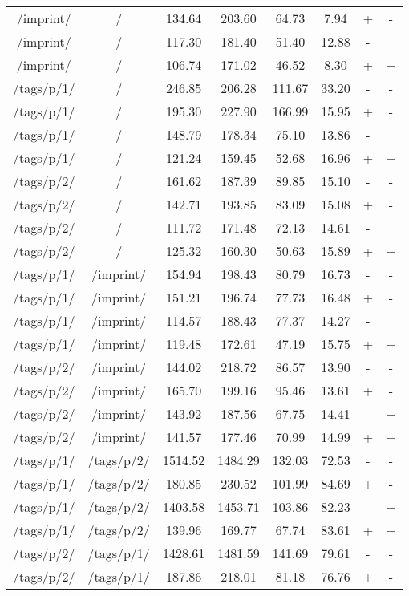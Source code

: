\begin{appendix}
\begin{center}
\begin{longtable}{cccccccc}
/imprint/ & / & 134.64 & 203.60 & 64.73 & 7.94 & + & - \\
/imprint/ & / & 117.30 & 181.40 & 51.40 & 12.88 & - & + \\
/imprint/ & / & 106.74 & 171.02 & 46.52 & 8.30 & + & + \\
\hline
\hline
/tags/p/1/ & / & 246.85 & 206.28 & 111.67 & 33.20 & - & - \\
/tags/p/1/ & / & 195.30 & 227.90 & 166.99 & 15.95 & + & - \\
/tags/p/1/ & / & 148.79 & 178.34 & 75.10 & 13.86 & - & + \\
/tags/p/1/ & / & 121.24 & 159.45 & 52.68 & 16.96 & + & + \\
\hline
/tags/p/2/ & / & 161.62 & 187.39 & 89.85 & 15.10 & - & - \\
/tags/p/2/ & / & 142.71 & 193.85 & 83.09 & 15.08 & + & - \\
/tags/p/2/ & / & 111.72 & 171.48 & 72.13 & 14.61 & - & + \\
/tags/p/2/ & / & 125.32 & 160.30 & 50.63 & 15.89 & + & + \\
\hline
/tags/p/1/ & /imprint/ & 154.94 & 198.43 & 80.79 & 16.73 & - & - \\
/tags/p/1/ & /imprint/ & 151.21 & 196.74 & 77.73 & 16.48 & + & - \\
/tags/p/1/ & /imprint/ & 114.57 & 188.43 & 77.37 & 14.27 & - & + \\
/tags/p/1/ & /imprint/ & 119.48 & 172.61 & 47.19 & 15.75 & + & + \\
\hline
/tags/p/2/ & /imprint/ & 144.02 & 218.72 & 86.57 & 13.90 & - & - \\
/tags/p/2/ & /imprint/ & 165.70 & 199.16 & 95.46 & 13.61 & + & - \\
/tags/p/2/ & /imprint/ & 143.92 & 187.56 & 67.75 & 14.41 & - & + \\
/tags/p/2/ & /imprint/ & 141.57 & 177.46 & 70.99 & 14.99 & + & + \\
\hline
\hline
/tags/p/1/ & /tags/p/2/ & 1514.52 & 1484.29 & 132.03 & 72.53 & - & - \\
/tags/p/1/ & /tags/p/2/ & 180.85 & 230.52 & 101.99 & 84.69 & + & - \\
/tags/p/1/ & /tags/p/2/ & 1403.58 & 1453.71 & 103.86 & 82.23 & - & + \\
/tags/p/1/ & /tags/p/2/ & 139.96 & 169.77 & 67.74 & 83.61 & + & + \\
\hline
/tags/p/2/ & /tags/p/1/ & 1428.61 & 1481.59 & 141.69 & 79.61 & - & - \\
/tags/p/2/ & /tags/p/1/ & 187.86 & 218.01 & 81.18 & 76.76 & + & - \\

\end{longtable}
\end{center}
\end{appendix}
